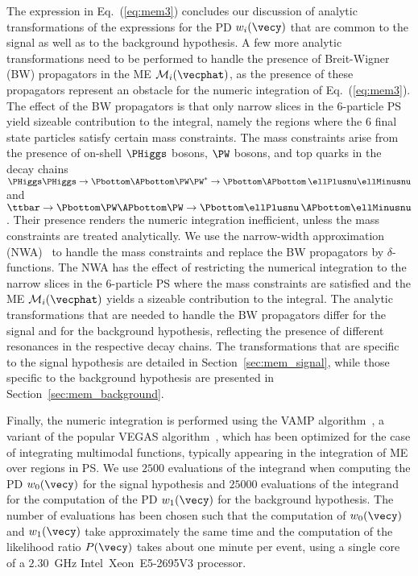 The expression in Eq.~(\ref{eq:mem3}) concludes our discussion of analytic transformations of the expressions for the PD $w_{i}(\vecy)$ 
that are common to the signal as well as to the background hypothesis.
A few more analytic transformations need to be performed to handle the presence of Breit-Wigner (BW) propagators in the ME $\mathcal{M}_{i}(\vecphat)$,
as the presence of these propagators represent an obstacle for the numeric integration of Eq.~(\ref{eq:mem3}).
The effect of the BW propagators is that only narrow slices in the $6$-particle PS yield sizeable contribution to the integral,
namely the regions where the $6$ final state particles satisfy certain mass constraints.
The mass constraints arise from the presence of on-shell $\PHiggs$ bosons, $\PW$ bosons, and top quarks in the decay chains
$\PHiggs\PHiggs \to \Pbottom\APbottom\PW\PW^{\ast} \to \Pbottom\APbottom \, \ellPlusnu\ellMinusnu$ and
$\ttbar \to \Pbottom\PW\APbottom\PW \to \Pbottom\ellPlusnu \, \APbottom\ellMinusnu$.
Their presence renders the numeric integration inefficient, unless the mass constraints are treated analytically. 
We use the narrow-width approximation (NWA)~\cite{NWA} to handle the mass constraints and replace the BW propagators by $\delta$-functions.
The NWA has the effect of restricting the numerical integration to the narrow slices in the $6$-particle PS where the mass constraints are satisfied
and the ME $\mathcal{M}_{i}(\vecphat)$ yields a sizeable contribution to the integral.
The analytic transformations that are needed to handle the BW propagators differ for the signal and for the background hypothesis,
reflecting the presence of different resonances in the respective decay chains.
The transformations that are specific to the signal hypothesis are detailed in Section~\ref{sec:mem_signal},
while those specific to the background hypothesis are presented in Section~\ref{sec:mem_background}.

Finally, the numeric integration is performed using the VAMP algorithm~\cite{VAMP}, a variant of the popular VEGAS algorithm~\cite{VEGAS},
which has been optimized for the case of integrating multimodal functions, typically appearing in the integration of ME over regions in PS.
We use $2500$ evaluations of the integrand when computing the PD $w_{0}(\vecy)$ for the signal hypothesis 
and $25000$ evaluations of the integrand for the computation of the PD $w_{1}(\vecy)$ for the background hypothesis.
The number of evaluations has been chosen such that the computation of $w_{0}(\vecy)$ and $w_{1}(\vecy)$ take approximately the same time
and the computation of the likelihood ratio $P(\vecy)$ takes about one minute per event,
using a single core of a $2.30$~GHz Intel\TReg~Xeon\TReg~E5-2695V3 processor.


